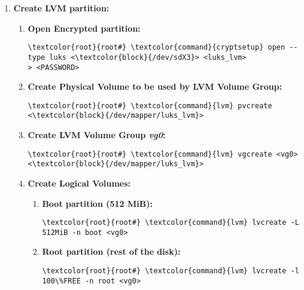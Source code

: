 \documentclass[10pt, a4paper, onecolumn, openany]{book} %
\begin{document}
\begin{enumerate}
    \item \textbf{Create LVM partition:}
    \begin{enumerate}
        \item \textbf{Open Encrypted partition:}
\begin{Verbatim}[commandchars=\\\{\}]
\textcolor{root}{root#} \textcolor{command}{cryptsetup} open --type luks <\textcolor{block}{/dev/sdX3}> <luks_lvm>
> <PASSWORD>
\end{Verbatim}
        \item \textbf{Create Physical Volume to be used by LVM Volume Group:}
\begin{Verbatim}[commandchars=\\\{\}]
\textcolor{root}{root#} \textcolor{command}{lvm} pvcreate <\textcolor{block}{/dev/mapper/luks_lvm}>
\end{Verbatim}
        \item \textbf{Create LVM Volume Group \textit{vg0}:}
\begin{Verbatim}[commandchars=\\\{\}]
\textcolor{root}{root#} \textcolor{command}{lvm} vgcreate <vg0> <\textcolor{block}{/dev/mapper/luks_lvm}>
\end{Verbatim}
        \item \textbf{Create Logical Volumes:}
            \begin{enumerate}
                \item \textbf{Boot partition (512 MiB):}
\begin{Verbatim}[commandchars=\\\{\}]
\textcolor{root}{root#} \textcolor{command}{lvm} lvcreate -L 512MiB -n boot <vg0>
\end{Verbatim}
                \item \textbf{Root partition (rest of the disk):}
\begin{Verbatim}[commandchars=\\\{\}]
\textcolor{root}{root#} \textcolor{command}{lvm} lvcreate -l 100\%FREE -n root <vg0>
\end{Verbatim}
            \end{enumerate}
            

\end{enumerate}
\end{enumerate}
\end{document}

